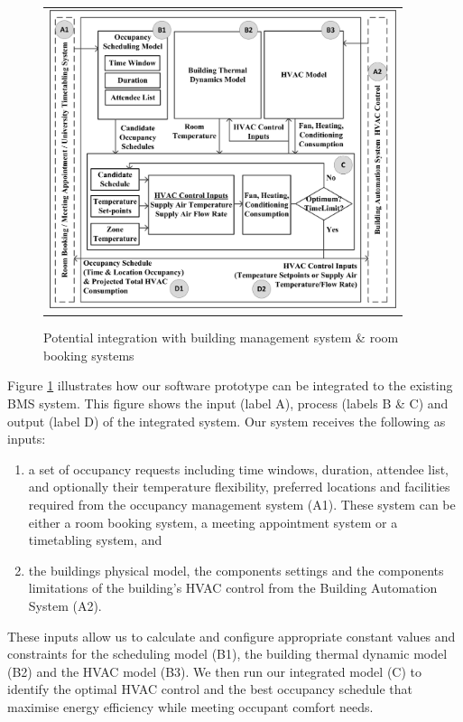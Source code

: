 \begin{figure}[ht]
\centering
\begin{tabular}{c}
\includegraphics[width=4in,keepaspectratio]{figs/intro_eams.jpg}
\end{tabular}
\caption{Potential integration with building management system \& room booking systems}
\label{intro:eams}
\end{figure}

Figure \ref{intro:eams} illustrates how our software prototype can be integrated to the existing BMS system. This figure shows the input (label A), process (labels B \& C) and output (label D) of the integrated system. Our system receives the following as inputs:  
\begin{enumerate}
	\item a set of occupancy requests including time windows, duration, attendee list, and optionally their temperature flexibility, preferred locations and facilities required from the occupancy management system (A1). These system can be either a room booking system, a meeting appointment system or a timetabling system, and
	\item the buildings physical model, the components settings and the components limitations of the building's HVAC control from the Building Automation System (A2).
\end{enumerate}

These inputs allow us to calculate and configure appropriate constant values and constraints for the scheduling model (B1), the building thermal dynamic model (B2) and the HVAC model (B3). We then run our integrated model (C) to identify the optimal HVAC control and the best occupancy schedule that maximise energy efficiency while meeting occupant comfort needs. 

